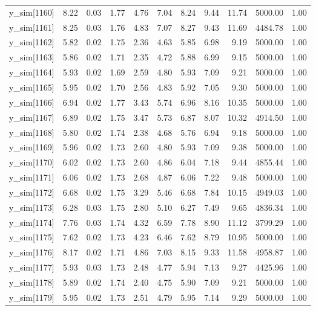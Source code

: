 \begin{table}[ht]
\begin{tabular}{rrrrrrrrrrr}
  y\_sim[1160] & 8.22 & 0.03 & 1.77 & 4.76 & 7.04 & 8.24 & 9.44 & 11.74 & 5000.00 & 1.00 \\ 
  y\_sim[1161] & 8.25 & 0.03 & 1.76 & 4.83 & 7.07 & 8.27 & 9.43 & 11.69 & 4484.78 & 1.00 \\ 
  y\_sim[1162] & 5.82 & 0.02 & 1.75 & 2.36 & 4.63 & 5.85 & 6.98 & 9.19 & 5000.00 & 1.00 \\ 
  y\_sim[1163] & 5.86 & 0.02 & 1.71 & 2.35 & 4.72 & 5.88 & 6.99 & 9.15 & 5000.00 & 1.00 \\ 
  y\_sim[1164] & 5.93 & 0.02 & 1.69 & 2.59 & 4.80 & 5.93 & 7.09 & 9.21 & 5000.00 & 1.00 \\ 
  y\_sim[1165] & 5.95 & 0.02 & 1.70 & 2.56 & 4.83 & 5.92 & 7.05 & 9.30 & 5000.00 & 1.00 \\ 
  y\_sim[1166] & 6.94 & 0.02 & 1.77 & 3.43 & 5.74 & 6.96 & 8.16 & 10.35 & 5000.00 & 1.00 \\ 
  y\_sim[1167] & 6.89 & 0.02 & 1.75 & 3.47 & 5.73 & 6.87 & 8.07 & 10.32 & 4914.50 & 1.00 \\ 
  y\_sim[1168] & 5.80 & 0.02 & 1.74 & 2.38 & 4.68 & 5.76 & 6.94 & 9.18 & 5000.00 & 1.00 \\ 
  y\_sim[1169] & 5.96 & 0.02 & 1.73 & 2.60 & 4.80 & 5.93 & 7.09 & 9.38 & 5000.00 & 1.00 \\ 
  y\_sim[1170] & 6.02 & 0.02 & 1.73 & 2.60 & 4.86 & 6.04 & 7.18 & 9.44 & 4855.44 & 1.00 \\ 
  y\_sim[1171] & 6.06 & 0.02 & 1.73 & 2.68 & 4.87 & 6.06 & 7.22 & 9.48 & 5000.00 & 1.00 \\ 
  y\_sim[1172] & 6.68 & 0.02 & 1.75 & 3.29 & 5.46 & 6.68 & 7.84 & 10.15 & 4949.03 & 1.00 \\ 
  y\_sim[1173] & 6.28 & 0.03 & 1.75 & 2.80 & 5.10 & 6.27 & 7.49 & 9.65 & 4836.34 & 1.00 \\ 
  y\_sim[1174] & 7.76 & 0.03 & 1.74 & 4.32 & 6.59 & 7.78 & 8.90 & 11.12 & 3799.29 & 1.00 \\ 
  y\_sim[1175] & 7.62 & 0.02 & 1.73 & 4.23 & 6.46 & 7.62 & 8.79 & 10.95 & 5000.00 & 1.00 \\ 
  y\_sim[1176] & 8.17 & 0.02 & 1.71 & 4.86 & 7.03 & 8.15 & 9.33 & 11.58 & 4958.87 & 1.00 \\ 
  y\_sim[1177] & 5.93 & 0.03 & 1.73 & 2.48 & 4.77 & 5.94 & 7.13 & 9.27 & 4425.96 & 1.00 \\ 
  y\_sim[1178] & 5.89 & 0.02 & 1.74 & 2.40 & 4.75 & 5.90 & 7.09 & 9.21 & 5000.00 & 1.00 \\ 
  y\_sim[1179] & 5.95 & 0.02 & 1.73 & 2.51 & 4.79 & 5.95 & 7.14 & 9.29 & 5000.00 & 1.00 \\ 

\end{tabular}
\end{table}
